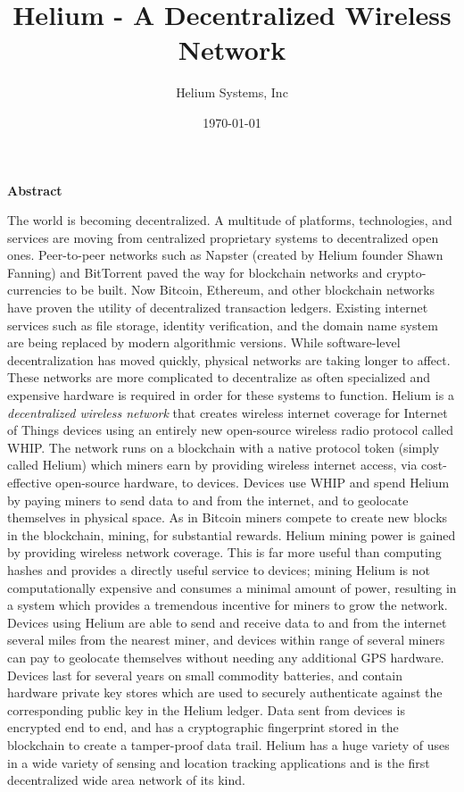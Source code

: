 \documentclass[letterpaper,11pt]{article}
\begin{document}
\title{Helium - A Decentralized Wireless Network}
\author{Helium Systems, Inc}
\date{\today}
\maketitle
\newpage

{\large \textbf{Abstract}}\newline

The world is becoming decentralized. A multitude of platforms, technologies, and services are moving from centralized proprietary systems to decentralized open ones. Peer-to-peer networks such as Napster \cite{napster} (created by Helium founder Shawn Fanning) and BitTorrent paved the way for blockchain networks and crypto-currencies to be built. Now Bitcoin, Ethereum, and other blockchain networks have proven the utility of decentralized transaction ledgers. Existing internet services such as file storage, identity verification, and the domain name system are being replaced by modern algorithmic versions. While software-level decentralization has moved quickly, physical networks are taking longer to affect. These networks are more complicated to decentralize as often specialized and expensive hardware is required in order for these systems to function.\newline
\newline
Helium is a \textit{decentralized wireless network} that creates wireless internet coverage for Internet of Things devices using an entirely new open-source wireless radio protocol called WHIP. The network runs on a blockchain with a native protocol token (simply called Helium) which miners earn by providing wireless internet access, via cost-effective open-source hardware, to devices. Devices use WHIP and spend Helium by paying miners to send data to and from the internet, and to geolocate themselves in physical space. As in Bitcoin miners compete to create new blocks in the blockchain, mining, for substantial rewards. Helium mining power is gained by providing wireless network coverage. This is far more useful than computing hashes and provides a directly useful service to devices; mining Helium is not computationally expensive and consumes a minimal amount of power, resulting in a system which provides a tremendous incentive for miners to grow the network. Devices using Helium are able to send and receive data to and from the internet several miles from the nearest miner, and devices within range of several miners can pay to geolocate themselves without needing any additional GPS hardware. Devices last for several years on small commodity batteries, and contain hardware private key stores which are used to securely authenticate against the corresponding public key in the Helium ledger. Data sent from devices is encrypted end to end, and has a cryptographic fingerprint stored in the blockchain to create a tamper-proof data trail.
\newline\newline
Helium has a huge variety of uses in a wide variety of sensing and location tracking applications and is the first decentralized wide area network of its kind.
\end{document}
